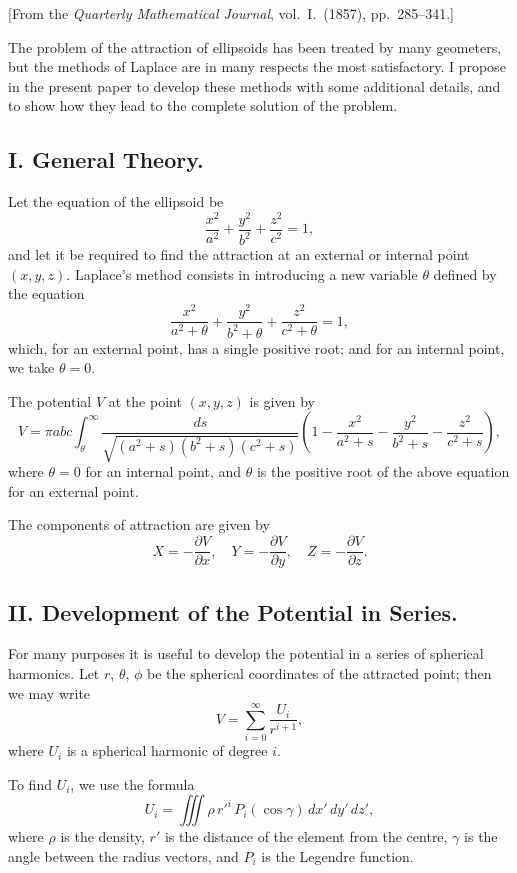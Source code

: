 \documentclass[11pt,a4paper]{article}
\theoremstyle{plain}
\begin{document}
[From the \textit{Quarterly Mathematical Journal}, vol.~I.~(1857), pp.~285--341.]

The problem of the attraction of ellipsoids has been treated by many geometers, but the methods of Laplace are in many respects the most satisfactory. I propose in the present paper to develop these methods with some additional details, and to show how they lead to the complete solution of the problem.

\subsection*{I. General Theory.}

Let the equation of the ellipsoid be
\[
\frac{x^2}{a^2} + \frac{y^2}{b^2} + \frac{z^2}{c^2} = 1,
\]
and let it be required to find the attraction at an external or internal point $(x,y,z)$. Laplace's method consists in introducing a new variable $\theta$ defined by the equation
\[
\frac{x^2}{a^2+\theta} + \frac{y^2}{b^2+\theta} + \frac{z^2}{c^2+\theta} = 1,
\]
which, for an external point, has a single positive root; and for an internal point, we take $\theta=0$.

The potential $V$ at the point $(x,y,z)$ is given by
\[
V = \pi abc \int_\theta^\infty \frac{ds}{\sqrt{(a^2+s)(b^2+s)(c^2+s)}}\left(1 - \frac{x^2}{a^2+s} - \frac{y^2}{b^2+s} - \frac{z^2}{c^2+s}\right),
\]
where $\theta=0$ for an internal point, and $\theta$ is the positive root of the above equation for an external point.

The components of attraction are given by
\[
X = -\frac{\partial V}{\partial x},\quad Y = -\frac{\partial V}{\partial y},\quad Z = -\frac{\partial V}{\partial z}.
\]

\subsection*{II. Development of the Potential in Series.}

For many purposes it is useful to develop the potential in a series of spherical harmonics. Let $r$, $\theta$, $\phi$ be the spherical coordinates of the attracted point; then we may write
\[
V = \sum_{i=0}^\infty \frac{U_i}{r^{i+1}},
\]
where $U_i$ is a spherical harmonic of degree $i$.

To find $U_i$, we use the formula
\[
U_i = \iiint \rho\, r'^i\, P_i(\cos\gamma)\, dx'\,dy'\,dz',
\]
where $\rho$ is the density, $r'$ is the distance of the element from the centre, $\gamma$ is the angle between the radius vectors, and $P_i$ is the Legendre function.
\end{document}
